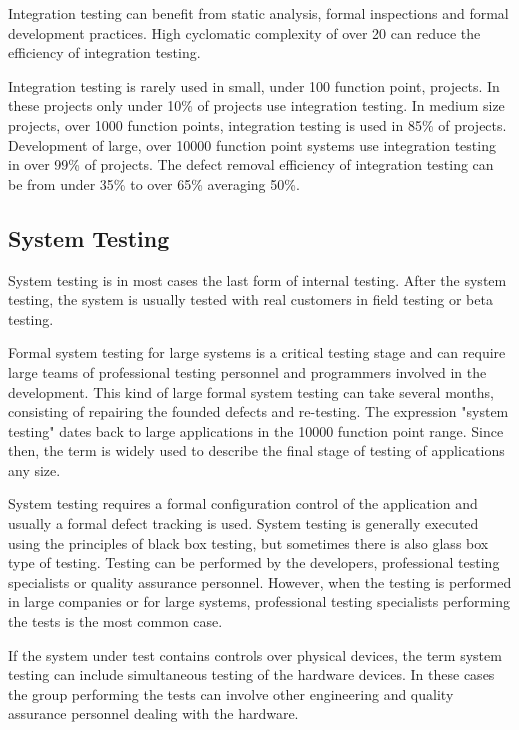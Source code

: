 Integration testing can benefit from static analysis, formal inspections and formal development practices. High cyclomatic complexity of over 20 can reduce the efficiency of integration testing. 

Integration testing is rarely used in small, under 100 function point, projects. In these projects only under 10\% of projects use integration testing. In medium size projects, over 1000 function points, integration testing is used in 85\% of projects. Development of large, over 10000 function point systems use integration testing in over 99\% of projects. The defect removal efficiency of integration testing can be from under 35\% to over 65\% averaging 50\%. 

 \subsection{System Testing}

System testing is in most cases the last form of internal testing. After the system testing, the system is usually tested with real customers in field testing or beta testing. 

Formal system testing for large systems is a critical testing stage and can require large teams of professional testing personnel and programmers involved in the development. This kind of large formal system testing can take several months, consisting of repairing the founded defects and re-testing. The expression "system testing" dates back to large applications in the 10000 function point range. Since then, the term is widely used to describe the final stage of testing of applications any size. 

System testing requires a formal configuration control of the application and usually a formal defect tracking is used. System testing is generally executed using the principles of black box testing, but sometimes there is also glass box type of testing. Testing can be performed by the developers, professional testing specialists or quality assurance personnel. However, when the testing is performed in large companies or for large systems, professional testing specialists performing the tests is the most common case.

If the system under test contains controls over physical devices, the term system testing can include simultaneous testing of the hardware devices. In these cases the group performing the tests can involve other engineering and quality assurance personnel dealing with the hardware.


